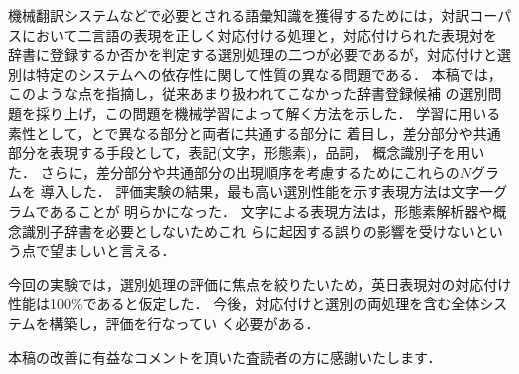 機械翻訳システムなどで必要とされる語彙知識を獲得するためには，対訳コーパ
スにおいて二言語の表現を正しく対応付ける処理と，対応付けられた表現対を
辞書に登録するか否かを判定する選別処理の二つが必要であるが，対応付けと選
別は特定のシステムへの依存性に関して性質の異なる問題である．
本稿では，このような点を指摘し，従来あまり扱われてこなかった辞書登録候補
の選別問題を採り上げ，この問題を機械学習によって解く方法を示した．
学習に用いる素性として，{\CT}と{\NT}で異なる部分と両者に共通する部分に
着目し，差分部分や共通部分を表現する手段として，表記(文字，形態素)，品詞，
概念識別子を用いた．
さらに，差分部分や共通部分の出現順序を考慮するためにこれらの$N$グラムを
導入した．
評価実験の結果，最も高い選別性能を示す表現方法は文字一グラムであることが
明らかになった．
文字による表現方法は，形態素解析器や概念識別子辞書を必要としないためこれ
らに起因する誤りの影響を受けないという点で望ましいと言える．

今回の実験では，選別処理の評価に焦点を絞りたいため，英日表現対の対応付け
性能は100\%であると仮定した．
今後，対応付けと選別の両処理を含む全体システムを構築し，評価を行なってい
く必要がある．

\acknowledgment

本稿の改善に有益なコメントを頂いた査読者の方に感謝いたします．

